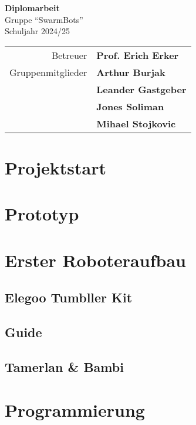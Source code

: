 \documentclass[12pt]{article}
\begin{document}
	
	
	\begin{titlepage}
		\centering
		\Huge
		\textbf{Diplomarbeit} \\
		\huge
		Gruppe ``SwarmBots'' \\
		Schuljahr 2024/25 \\
		\vspace{2cm}
		\Large
		\begin{tabular}{r @{: } >{\bfseries} l}
			Betreuer & Prof. Erich Erker\\
			Gruppenmitglieder & Arthur Burjak \\
			& Leander Gastgeber \\
			& Jones Soliman \\
			& Mihael Stojkovic
	\end{tabular}
	\end{titlepage}
	\newpage
	
	\tableofcontents
	\newpage
	
	\section{Projektstart}
	\section{Prototyp}
	\section{Erster Roboteraufbau}
	\subsection{Elegoo Tumbller Kit}
	\subsection{Guide}
	\subsection{Tamerlan \& Bambi}
	\section{Programmierung}
\end{document}
